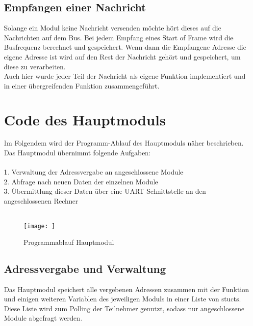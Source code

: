 



\subsection{Empfangen einer Nachricht}
\textmd{Solange ein Modul keine Nachricht versenden möchte hört dieses auf die Nachrichten auf dem Bus. Bei jedem Empfang eines Start of Frame wird die Busfrequenz berechnet und gespeichert. Wenn dann die Empfangene Adresse die eigene Adresse ist wird auf den Rest der Nachricht gehört und gespeichert, um diese zu verarbeiten.\\
	Auch hier wurde jeder Teil der Nachricht als eigene Funktion implementiert und in einer übergreifenden Funktion zusammengeführt.
}






\section{Code des Hauptmoduls}
\textmd{Im Folgendem wird der Programm-Ablauf des Hauptmoduls näher beschrieben.\\ 
	Das Hauptmodul übernimmt folgende Aufgaben:\\\\
	1. Verwaltung der Adressvergabe an angeschlossene Module\\
	2. Abfrage nach neuen Daten der einzelnen Module\\
	3. Übermittlung dieser Daten über eine UART-Schnittstelle an den angeschlossenen Rechner\\\\ 
}
\begin{figure}[H]
	\centering    
	\texttt{[image: ]}
	\caption{Programmablauf Hauptmodul}
	\label{Programm_Hauptmodul}
\end{figure}
\textmd{
}
\subsection{Adressvergabe und Verwaltung}
\textmd{Das Hauptmodul speichert alle vergebenen Adressen zusammen mit der Funktion und einigen weiteren Variablen des jeweiligen Moduls in einer Liste von stucts.\\
	Diese Liste wird zum Polling der Teilnehmer genutzt, sodass nur angeschlossene Module abgefragt werden.\\}


